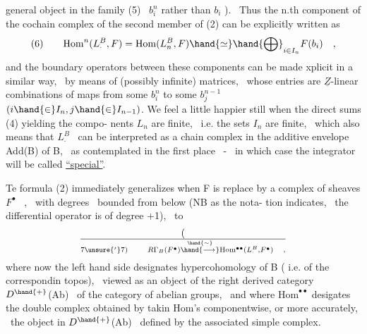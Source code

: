 general object in the family (5) \ $b_i^n$ rather than $b_i$ ). \ Thus the n.th
component of the cochain complex of the second member of (2) can be
explicitly written as
\[ (6) \qquad \mathrm{Hom}^n(L_\cdot^B,F) = \mathrm{Hom}(L_n^B,F) \hand{\simeq} \hand{\bigoplus}_{i\in I_n} F(b_i) \quad , \]
and the boundary operators between these components can be made xplicit
in a similar way, \ by means of (possibly infinite) matrices, \ whose entries
are $\underline{Z}$-linear combinations of maps from some $b_i^n$ to some $b_j^{n-1}$ \ $(i \hand{\in} I_n, j\hand{\in} I_{n-1})$.
We feel a little happier still when the direct sums (4) yielding the compo-%
nents $L_n$ are finite, \ i.e. the sets $I_n$ are finite, \ which also means that
$L_\cdot^B$ \ can be interpreted as a chain complex in the additive envelope Add(B)
of B, \ as contemplated in the first place \ - \ in which case the integrator
will be called \uline{``special''}.

Te formula (2) immediately generalizes when F is replace by a 
complex of sheaves $F^\bullet$ \ , \ with degrees \ bounded from below (NB as the nota-%
tion indicates, \ the differential operator is of degree +1), \ to
\[ (\over{7\unsure{'}}{7}) \qquad R\Gamma_B(F^\bullet) \overset{\hand{\sim}}{\hand{\longrightarrow}} \mathrm{Hom}^{\bullet\bullet}(L_\cdot^B,F^\bullet) \quad , \]
where now the  left hand side designates hypercohomology of B ( i.e.
of the correspondin topos), \ viewed as an object of the right derived
category \ $D^{\hand{+}}$(Ab) \ of the category of abelian groups, \ and where $\mathrm{Hom}^{\bullet\bullet}$
desigates the double complex obtained by takin Hom's componentwise,
or more accurately, \ the object in $D^{\hand{+}}$(Ab) \ defined by the associated simple
complex.

